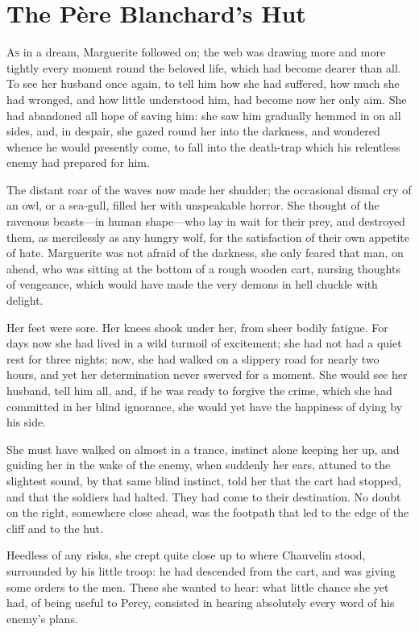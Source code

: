 
\chapter{The Père Blanchard's Hut}
\lettrine[lines=4]{A}{s} in a dream, Marguerite followed on; the web was drawing more and more tightly every moment round the beloved life, which had become dearer than all. To see her husband once again, to tell him how she had suffered, how much she had wronged, and how little understood him, had become now her only aim. She had abandoned all hope of saving him: she saw him gradually hemmed in on all sides, and, in despair, she gazed round her into the darkness, and wondered whence he would presently come, to fall into the death-trap which his relentless enemy had prepared for him.

The distant roar of the waves now made her shudder; the occasional dismal cry of an owl, or a sea-gull, filled her with unspeakable horror. She thought of the ravenous beasts---in human shape---who lay in wait for their prey, and destroyed them, as mercilessly as any hungry wolf, for the satisfaction of their own appetite of hate. Marguerite was not afraid of the darkness, she only feared that man, on ahead, who was sitting at the bottom of a rough wooden cart, nursing thoughts of vengeance, which would have made the very demons in hell chuckle with delight.

Her feet were sore. Her knees shook under her, from sheer bodily fatigue. For days now she had lived in a wild turmoil of excitement; she had not had a quiet rest for three nights; now, she had walked on a slippery road for nearly two hours, and yet her determination never swerved for a moment. She would see her husband, tell him all, and, if he was ready to forgive the crime, which she had committed in her blind ignorance, she would yet have the happiness of dying by his side.

She must have walked on almost in a trance, instinct alone keeping her up, and guiding her in the wake of the enemy, when suddenly her ears, attuned to the slightest sound, by that same blind instinct, told her that the cart had stopped, and that the soldiers had halted. They had come to their destination. No doubt on the right, somewhere close ahead, was the footpath that led to the edge of the cliff and to the hut.

Heedless of any risks, she crept quite close up to where Chauvelin stood, surrounded by his little troop: he had descended from the cart, and was giving some orders to the men. These she wanted to hear: what little chance she yet had, of being useful to Percy, consisted in hearing absolutely every word of his enemy's plans.


